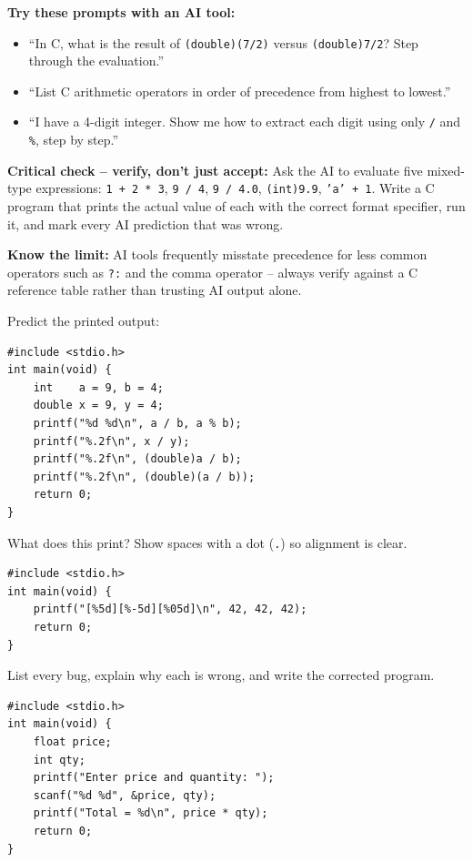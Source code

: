 \documentclass[11pt]{article}
\begin{document}
\begin{aicollab}
\textbf{Try these prompts with an AI tool:}
\begin{itemize}[leftmargin=*,nosep]
  \item ``In C, what is the result of \texttt{(double)(7/2)} versus \texttt{(double)7/2}?
        Step through the evaluation.''
  \item ``List C arithmetic operators in order of precedence from highest to lowest.''
  \item ``I have a 4-digit integer. Show me how to extract each digit using only
        \texttt{/} and \texttt{\%}, step by step.''
\end{itemize}

\medskip\textbf{Critical check -- verify, don't just accept:}
Ask the AI to evaluate five mixed-type expressions:
\texttt{1 + 2 * 3}, \texttt{9 / 4}, \texttt{9 / 4.0}, \texttt{(int)9.9}, \texttt{'a' + 1}.
Write a C program that prints the actual value of each with the correct format specifier,
run it, and mark every AI prediction that was wrong.

\medskip\textbf{Know the limit:}
AI tools frequently misstate precedence for less common operators such as \texttt{?:} and
the comma operator -- always verify against a C reference table rather than trusting AI
output alone.
\end{aicollab}

\takehomebanner

\begin{trace}
Predict the printed output:
\begin{lstlisting}
#include <stdio.h>
int main(void) {
    int    a = 9, b = 4;
    double x = 9, y = 4;
    printf("%d %d\n", a / b, a % b);
    printf("%.2f\n", x / y);
    printf("%.2f\n", (double)a / b);
    printf("%.2f\n", (double)(a / b));
    return 0;
}
\end{lstlisting}
\end{trace}

\begin{trace}
What does this print? Show spaces with a dot (\texttt{.}) so alignment is clear.
\begin{lstlisting}
#include <stdio.h>
int main(void) {
    printf("[%5d][%-5d][%05d]\n", 42, 42, 42);
    return 0;
}
\end{lstlisting}
\end{trace}

\begin{bug}
List every bug, explain why each is wrong, and write the corrected program.
\begin{lstlisting}
#include <stdio.h>
int main(void) {
    float price;
    int qty;
    printf("Enter price and quantity: ");
    scanf("%d %d", &price, qty);
    printf("Total = %d\n", price * qty);
    return 0;
}
\end{lstlisting}
\end{bug}
\end{document}
